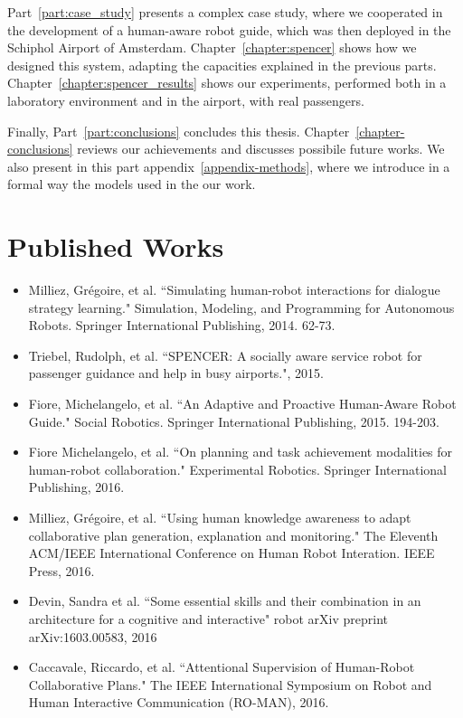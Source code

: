 Part~\ref{part:case_study} presents a complex case study, where we cooperated in the development of a human-aware robot guide, which was then deployed in the Schiphol Airport of Amsterdam. Chapter~\ref{chapter:spencer} shows how we designed this system, adapting the capacities explained in the previous parts. Chapter~\ref{chapter:spencer_results} shows our experiments, performed both in a laboratory environment and in the airport, with real passengers.

Finally, Part~\ref{part:conclusions} concludes this thesis. Chapter~\ref{chapter-conclusions} reviews our achievements and discusses possibile future works. We also present in this part appendix~\ref{appendix-methods}, where we introduce in a formal way the models used in the our work.

\section{Published Works}
\begin{itemize}
\item Milliez, Grégoire, et al. ``Simulating human-robot interactions for dialogue strategy learning." Simulation, Modeling, and Programming for Autonomous Robots. Springer International Publishing, 2014. 62-73.
\item Triebel, Rudolph, et al. ``SPENCER: A socially aware service robot for passenger guidance and help in busy airports.", 2015.
\item Fiore, Michelangelo, et al. ``An Adaptive and Proactive Human-Aware Robot Guide." Social Robotics. Springer International Publishing, 2015. 194-203.
\item Fiore Michelangelo, et al. ``On planning and task achievement modalities for human-robot collaboration." Experimental Robotics. Springer International Publishing, 2016.
\item Milliez, Grégoire, et al. ``Using human knowledge awareness to adapt collaborative plan generation, explanation and monitoring." The Eleventh ACM/IEEE International Conference on Human Robot Interation. IEEE Press, 2016.
\item Devin, Sandra et al. ``Some essential skills and their combination in an architecture for a cognitive and interactive" robot arXiv preprint arXiv:1603.00583, 2016
\item Caccavale, Riccardo, et al. ``Attentional Supervision of Human-Robot Collaborative Plans." The IEEE International Symposium on Robot and Human Interactive Communication (RO-MAN), 2016.
\end{itemize}


